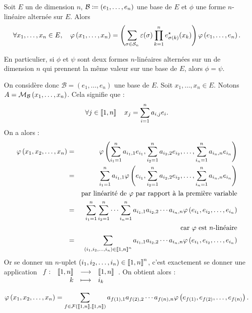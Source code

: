 \documentclass{magnolia}
\begin{document}
\begin{proposition}
Soit $E$ un \Kev de dimension $n$, $\mathcal{B}\coloneqq(e_1,\ldots,e_n)$ une base de
$E$ et $\phi$ une forme $n$-linéaire alternée sur $E$. Alors
\[\forall x_1,\ldots,x_n\in E\qsep \phi\p{x_1,\ldots,x_n}=\p{\sum_{\sigma\in\gsym{n}} \signat{\sigma} \prod_{k=1}^n e_{\sigma(k)}^{\star}(x_k)}
  \phi\p{e_1,\ldots,e_n}.\]
\end{proposition}

\begin{remarqueUnique}
\remarque En particulier, si $\phi$ et $\psi$ sont deux formes $n$-linéaires alternées sur un \Kev de dimension
  $n$ qui prennent la même valeur sur une base de $E$, alors $\phi=\psi$.
\end{remarqueUnique}

\begin{preuve}
On considère donc $\mathcal{B}=(e_1,\ldots,e_n)$ une base de $E$. 
Soit $x_1,\ldots,x_n\in E$. Notons $A=\mathcal{M}_{\mathcal{B}}\left(x_1,\ldots,x_n\right)$. Cela signifie que :
  \[\forall j\in\left\llbracket 1,n\right\rrbracket \quad x_j=\sum_{i=1}^n a_{i,j} e_i.\]
  On a alors :
  \begin{eqnarray*}
  \varphi\left(x_1,x_2,\ldots,x_n\right)
  &=& \varphi\left(\sum_{i_1=1}^n a_{i_1,1} e_{i_1},\sum_{i_2=1}^n a_{i_2,2} e_{i_2},\ldots,
             \sum_{i_n=1}^n a_{i_n,n} e_{i_n}\right)\\
  &=& \sum_{i_1=1}^n a_{i_1,1} \varphi\left(e_{i_1},\sum_{i_2=1}^n a_{i_2,2} e_{i_2},\ldots,
             \sum_{i_n=1}^n a_{i_n,n} e_{i_n}\right)\\
  & & \text{par linéarité de $\varphi$ par rapport à la première variable}\\
  &=& \sum_{i_1=1}^n \sum_{i_2=1}^n \cdots \sum_{i_n=1}^n
       a_{i_1,1} a_{i_2,2} \cdots a_{i_n,n} \varphi\left(e_{i_1},e_{i_2},\ldots,e_{i_n}\right)\\
  & & \text{car $\varphi$ est $n$-linéaire}\\
  &=& \sum_{\left(i_1,i_2,\ldots,i_n\right)\in\left\llbracket 1,n\right\rrbracket^n}
       a_{i_1,1} a_{i_2,2} \cdots a_{i_n,n} \varphi\left(e_{i_1},e_{i_2},\ldots,e_{i_n}\right)
  \end{eqnarray*}
Or se donner un $n$-uplet $\left(i_1,i_2,\ldots,i_n\right)\in\left\llbracket 1,n\right\rrbracket^n$, c'est exactement se donner une application $\begin{array}[t]{lrcl} \displaystyle{f} : & \displaystyle{\left\llbracket 1,n\right\rrbracket} & \longrightarrow & \displaystyle{\left\llbracket 1,n\right\rrbracket} \\ & \displaystyle{k} & \longmapsto & \displaystyle{i_k} \end{array}$. On obtient alors :
  
$$\varphi\left(x_1,x_2,\ldots,x_n\right)= \sum_{f\in\mathcal{F}\left(\left\llbracket 1,n\right\rrbracket,\left\llbracket 1,n\right\rrbracket\right)}
       a_{f\left(1\right),1} a_{f\left(2\right),2} \cdots a_{f(n),n}
       \varphi\left(e_{f\left(1\right)},e_{f\left(2\right)},\ldots,e_{f(n)}\right).$$
       

\end{preuve}
\end{document}
